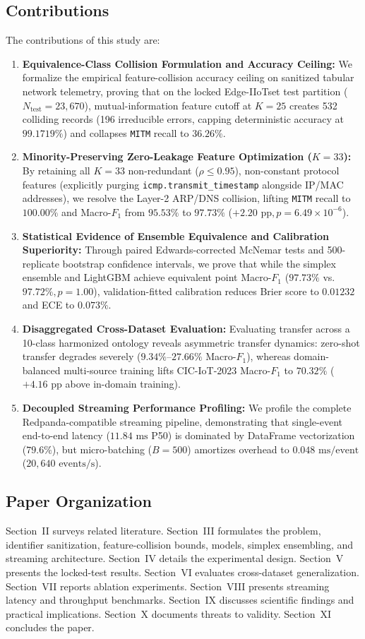 \documentclass[10pt,journal,twocolumn]{IEEEtran}
\begin{document}
\subsection{Contributions}
The contributions of this study are:
\begin{enumerate}
    \item \textbf{Equivalence-Class Collision Formulation and Accuracy Ceiling:} We formalize the empirical feature-collision accuracy ceiling on sanitized tabular network telemetry, proving that on the locked Edge-IIoTset test partition ($N_{\text{test}}=23,670$), mutual-information feature cutoff at $K=25$ creates 532 colliding records (196 irreducible errors, capping deterministic accuracy at $99.1719\%$) and collapses \texttt{MITM} recall to $36.26\%$.
    \item \textbf{Minority-Preserving Zero-Leakage Feature Optimization ($K=33$):} By retaining all $K=33$ non-redundant ($\rho \le 0.95$), non-constant protocol features (explicitly purging \texttt{icmp.transmit\_timestamp} alongside IP/MAC addresses), we resolve the Layer-2 ARP/DNS collision, lifting \texttt{MITM} recall to $100.00\%$ and Macro-$F_1$ from $95.53\%$ to $97.73\%$ ($+2.20\text{ pp}, p=6.49 \times 10^{-6}$).
    \item \textbf{Statistical Evidence of Ensemble Equivalence and Calibration Superiority:} Through paired Edwards-corrected McNemar tests and 500-replicate bootstrap confidence intervals, we prove that while the simplex ensemble and LightGBM achieve equivalent point Macro-$F_1$ ($97.73\%$ vs.\ $97.72\%, p=1.00$), validation-fitted calibration reduces Brier score to $0.01232$ and ECE to $0.073\%$.
    \item \textbf{Disaggregated Cross-Dataset Evaluation:} Evaluating transfer across a 10-class harmonized ontology reveals asymmetric transfer dynamics: zero-shot transfer degrades severely ($9.34\%\text{--}27.66\%$ Macro-$F_1$), whereas domain-balanced multi-source training lifts CIC-IoT-2023 Macro-$F_1$ to $70.32\%$ ($+4.16\text{ pp}$ above in-domain training).
    \item \textbf{Decoupled Streaming Performance Profiling:} We profile the complete Redpanda-compatible streaming pipeline, demonstrating that single-event end-to-end latency ($11.84\text{ ms}$ P50) is dominated by DataFrame vectorization ($79.6\%$), but micro-batching ($B=500$) amortizes overhead to $0.048\text{ ms/event}$ ($20,640\text{ events/s}$).
\end{enumerate}

\subsection{Paper Organization}
Section~II surveys related literature. Section~III formulates the problem, identifier sanitization, feature-collision bounds, models, simplex ensembling, and streaming architecture. Section~IV details the experimental design. Section~V presents the locked-test results. Section~VI evaluates cross-dataset generalization. Section~VII reports ablation experiments. Section~VIII presents streaming latency and throughput benchmarks. Section~IX discusses scientific findings and practical implications. Section~X documents threats to validity. Section~XI concludes the paper.
\end{document}
